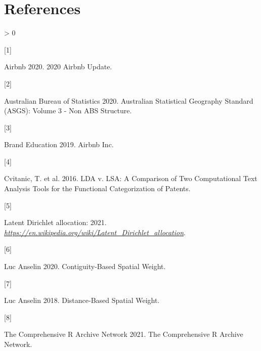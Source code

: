 \documentclass{acm_proc_article-sp}
\newlength{\csllabelwidth}
\newlength{\cslhangindent}
\newenvironment{CSLReferences}[3] %
 {%
  \setlength{\parindent}{0pt}
  \ifodd #1 \everypar{\setlength{\hangindent}{\cslhangindent}}\ignorespaces\fi
  \ifnum #2 > 0
  \setlength{\parskip}{#2\baselineskip}
  \fi
 }%
 {}
\newcommand{\CSLLeftMargin}[1]{\parbox[t]{\csllabelwidth}{#1}}
\newcommand{\CSLRightInline}[1]{\parbox[t]{\linewidth - \csllabelwidth}{#1}}
\begin{document}
\hypertarget{references}{%
\section*{References}\label{references}}

\hypertarget{refs}{}
\begin{CSLReferences}{0}{0}
\leavevmode\hypertarget{ref-airbnb2020}{}%
\CSLLeftMargin{{[}1{]} }
\CSLRightInline{Airbnb 2020. 2020 Airbnb Update.}

\leavevmode\hypertarget{ref-abs}{}%
\CSLLeftMargin{{[}2{]} }
\CSLRightInline{Australian Bureau of Statistics 2020. Australian
Statistical Geography Standard (ASGS): Volume 3 - Non ABS Structure.}

\leavevmode\hypertarget{ref-brandeduc2019}{}%
\CSLLeftMargin{{[}3{]} }
\CSLRightInline{Brand Education 2019. Airbnb Inc.}

\leavevmode\hypertarget{ref-git2016}{}%
\CSLLeftMargin{{[}4{]} }
\CSLRightInline{Cvitanic, T. et al. 2016. LDA v. LSA: A Comparison of
Two Computational Text Analysis Tools for the Functional Categorization
of Patents.}

\leavevmode\hypertarget{ref-wikilda2021}{}%
\CSLLeftMargin{{[}5{]} }
\CSLRightInline{Latent Dirichlet allocation: 2021.
\emph{\url{https://en.wikipedia.org/wiki/Latent_Dirichlet_allocation}}.}

\leavevmode\hypertarget{ref-contiguityneigh}{}%
\CSLLeftMargin{{[}6{]} }
\CSLRightInline{Luc Anselin 2020. Contiguity-Based Spatial Weight.}

\leavevmode\hypertarget{ref-distanceneigh}{}%
\CSLLeftMargin{{[}7{]} }
\CSLRightInline{Luc Anselin 2018. Distance-Based Spatial Weight.}

\leavevmode\hypertarget{ref-cran2021}{}%
\CSLLeftMargin{{[}8{]} }
\CSLRightInline{The Comprehensive R Archive Network 2021. The
Comprehensive R Archive Network.}

\end{CSLReferences}
\setlength{\parindent}{0in}
\end{document}
